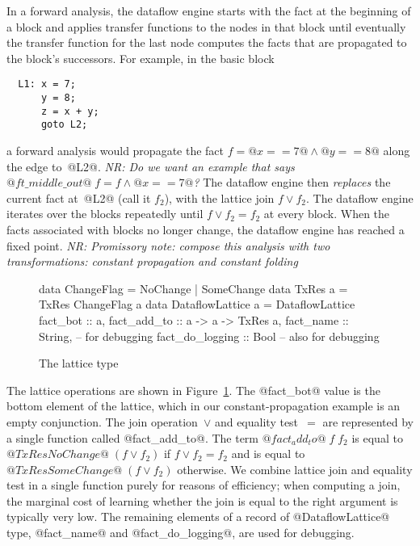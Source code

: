 \documentclass[blockstyle,preprint,nocopyrightspace]{sigplanconf}
\newcommand{\authornote}[1]{{\em #1}}
\newcommand{\norman}[1]{\authornote{NR: #1}}
\let\remark\norman
\newcommand\seclabel[1]{\label{sec:#1}}
\newcommand\figref[1]{Figure~\ref{fig:#1}}
\newcommand\figlabel[1]{\label{fig:#1}}
\begin{document}
In a forward analysis, the dataflow engine starts with the fact at the
beginning of a block and applies transfer functions to the nodes in
that block until eventually the transfer function for the last node
computes the facts that are propagated to the block's successors.
For example, in the basic block
\begin{verbatim}
  L1: x = 7;
      y = 8;
      z = x + y;
      goto L2;
\end{verbatim}
a forward analysis would propagate the fact 
$f = @x == 7@ \land @y == 8@$ along the edge to~@L2@.
\remark{Do we want an example that says 
$@ft\_middle\_out@\;f = f \land @x == 7@$?}
The dataflow engine then \emph{replaces} the current fact at~@L2@
(call it $f_2$), with the lattice join $f \vee f_2$.
The dataflow engine iterates over the blocks repeatedly until
$f \vee f_2 = f_2$ at every block.
When the facts associated with blocks no longer change, the dataflow
engine has reached a fixed point.
\remark{Promissory note: compose this analysis with two
transformations: constant propagation and constant folding}


\begin{figure}
\begin{code}
data ChangeFlag = NoChange | SomeChange
data TxRes a    = TxRes ChangeFlag a
data DataflowLattice a = DataflowLattice
 {fact_bot        :: a,
  fact_add_to     :: a -> a -> TxRes a,
  fact_name       :: String, -- for debugging
  fact_do_logging :: Bool}   -- also for debugging
\end{code}
\caption{The lattice type} \figlabel{lattice-type} \figlabel{lattice}
\end{figure}

The lattice operations are shown in \figref{lattice}.
The @fact_bot@ value is the bottom element of the
lattice, which in our constant-propagation example is an empty
conjunction.
The join operation~$\vee$ and equality test~$=$ are represented by a
single function called @fact_add_to@.
The term $@fact_add_to@\;f\;f_2$ is equal to
$@TxRes NoChange@\; (f \vee f_2)$ if $f \vee f_2 = f_2$
and is equal to
$@TxRes SomeChange@\; (f \vee f_2)$ otherwise.
We combine lattice join and equality test in a single function purely
for reasons of efficiency;
when computing a join, the marginal cost of learning whether the join
is equal to the right argument is typically very low.
%
The remaining elements of a record of @DataflowLattice@ type,
@fact_name@ 
and @fact_do_logging@,
 are used
for debugging.


\seclabel{create-analysis}
\end{document}
